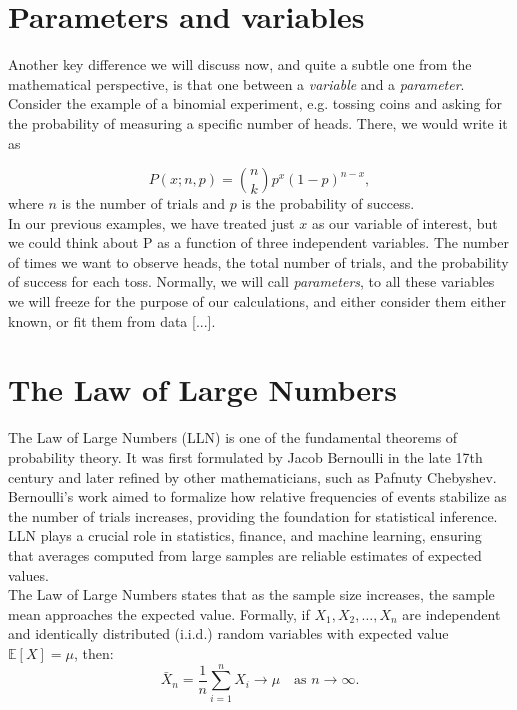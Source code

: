 \documentclass{book}
\begin{document}
\section{Parameters and variables}
Another key difference we will discuss now, and quite a subtle one from the mathematical perspective, is that one between a \textit{variable} and a \textit{parameter}. Consider the example of a binomial experiment, e.g. tossing coins and asking for the probability of measuring a specific number of heads. There, we would write it as 

\begin{equation}
    P(x; n, p) = \binom{n}{k} p^x (1-p)^{n-x},
\end{equation}
where $n$ is the number of trials and $p$ is the probability of success.\\

In our previous examples, we have treated just $x$ as our variable of interest, but we could think about P as a function of three independent variables. The number of times we want to observe heads, the total number of trials, and the probability of success for each toss. Normally, we will call \textit{parameters}, to all these variables we will freeze for the purpose of our calculations, and either consider them either known, or fit them from data [...].
 
 \newpage 
 
\section{The Law of Large Numbers}

The Law of Large Numbers (LLN) is one of the fundamental theorems of probability theory. It was first formulated by Jacob Bernoulli in the late 17th century and later refined by other mathematicians, such as Pafnuty Chebyshev. Bernoulli's work aimed to formalize how relative frequencies of events stabilize as the number of trials increases, providing the foundation for statistical inference. LLN plays a crucial role in statistics, finance, and machine learning, ensuring that averages computed from large samples are reliable estimates of expected values.\\

The Law of Large Numbers states that as the sample size increases, the sample mean approaches the expected value. Formally, if $X_1, X_2, \dots, X_n$ are independent and identically distributed (i.i.d.) random variables with expected value $\mathbb{E}[X] = \mu$, then:
\begin{equation}
    \bar{X}_n = \frac{1}{n} \sum_{i=1}^{n} X_i \to \mu \quad \text{as } n \to \infty.
\end{equation}
\end{document}
